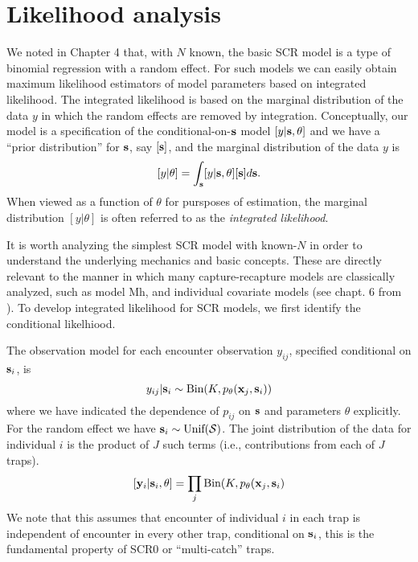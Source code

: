 \section{Likelihood analysis }

We noted in Chapter 4 that, with $N$ known, the basic SCR model is a
type of binomial regression with a random effect. For such models we
can easily obtain maximum likelihood estimators of model parameters
based on integrated likelihood. The integrated likelihood is based on
the marginal distribution of the data $y$ in which the random effects
are removed by integration. Conceptually, our model is a specification
of the conditional-on-${\bf s}$ model $[y|{\bf s},\theta]$ and we have
a ``prior distribution'' for ${\bf s}$, say $[{\bf s}]$, and the
marginal distribution of the data $y$ is
\[
[y|\theta] =  \int_{\bf s} [y|{\bf s},\theta][{\bf s}] d{\bf s}.
\]
When viewed as a function of $\theta$ for pursposes of estimation, the
marginal distribution $[y|\theta]$ is often referred to as the {\it
  integrated likelihood}.


It is worth analyzing 
the simplest SCR model with known-$N$ in order to understand the
underlying mechanics and basic concepts. These are directly relevant to
the manner in which many capture-recapture models are classically
analyzed, such as model Mh, and individual covariate models (see
chapt. 6 from \citet{royle_dorazio:2008}). To develop integrated
likelihood for SCR models, we first identify the conditional
likelhiood. 

The observation model for each encounter observation $y_{ij}$,
specified conditional on ${\bf s}_{i}$, is 
\begin{equation}
	y_{ij}| {\bf s}_{i} \sim \mbox{Bin}(K, p_{\theta}({\bf x}_{j},{\bf s}_{i}))
\label{mle.eq.cond-on-s}
\end{equation}
where we have indicated the dependence of $p_{ij}$ on ${\bf s}$ and
parameters $\theta$
explicitly.
For the random effect we have ${\bf s}_{i} \sim  \mbox{Unif}({\cal
  S})$.
The joint distribution of the data for individual $i$ is the product
of $J$ such terms (i.e., contributions from each of $J$ traps).
\[
  [{\bf y}_{i} | {\bf s}_{i} , \theta] = 
  \prod_{j} \mbox{Bin}(K, p_{\theta}({\bf x}_{j},{\bf s}_{i})
\]
We note that this assumes that encounter of individual $i$ in each
trap is independent of encounter in every other trap, conditional on
${\bf s}_{i}$, this is the fundamental property of SCR0 or
``multi-catch'' traps. 

